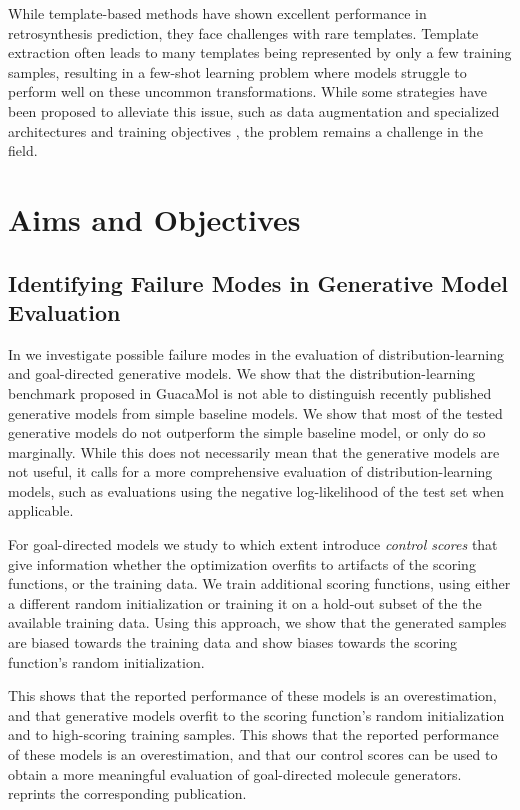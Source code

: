 While template-based methods have shown excellent performance in retrosynthesis prediction, they
face challenges with rare templates. Template extraction often leads to many templates being
represented by only a few training samples, resulting in a few-shot learning problem where models
struggle to perform well on these uncommon transformations. While some strategies have been proposed
to alleviate this issue, such as data augmentation \citep{fortunatoDataAugmentationPretraining2020}
and specialized architectures and training objectives
\citep{daiRetrosynthesisPredictionConditional2020}, the problem remains a challenge in the field.

\section{Aims and Objectives\label{sec:aims-objectives}}
\subsection{Identifying Failure Modes in Generative Model Evaluation}
In \citep{renzFailureModesMolecule2019} we investigate possible failure modes in the evaluation of
distribution-learning and goal-directed generative models. We show that the distribution-learning
benchmark proposed in GuacaMol \citep{brownGuacaMolBenchmarkingModels2019} is not able to
distinguish recently published generative models from simple baseline models. We show that most of
the tested generative models do not outperform the simple baseline model, or only do so marginally.
While this does not necessarily mean that the generative models are not useful, it calls for a more
comprehensive evaluation of distribution-learning models, such as evaluations using the negative
log-likelihood of the test set when applicable.

For goal-directed models we study to which extent introduce \emph{control scores} that give information whether the
optimization overfits to artifacts of the scoring functions, or the training data. We train
additional scoring functions, using either a different random initialization or training it
on a hold-out subset of the the available training data. Using this approach, we show that
the generated samples are biased towards the training data and show biases towards the
scoring function's random initialization.

This shows that the reported performance of these models is an overestimation, and
that generative models overfit to the scoring function's random initialization and to high-scoring
training samples. This shows that the reported performance of these models is an overestimation, and
that our control scores can be used to obtain a more meaningful evaluation of goal-directed molecule
generators.  reprints the corresponding publication.

